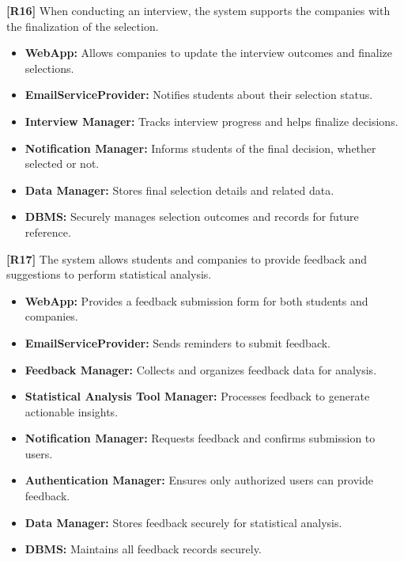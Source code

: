 \textbf{[R16]} When conducting an interview, the system supports the companies with the finalization of the selection.  
\begin{itemize}
    \item \textbf{WebApp:} Allows companies to update the interview outcomes and finalize selections.  
    \item \textbf{EmailServiceProvider:} Notifies students about their selection status.  
    \item \textbf{Interview Manager:} Tracks interview progress and helps finalize decisions.  
    \item \textbf{Notification Manager:} Informs students of the final decision, whether selected or not.  
    \item \textbf{Data Manager:} Stores final selection details and related data.  
    \item \textbf{DBMS:} Securely manages selection outcomes and records for future reference.  
\end{itemize}  

\textbf{[R17]} The system allows students and companies to provide feedback and suggestions to perform statistical analysis.  
\begin{itemize}
    \item \textbf{WebApp:} Provides a feedback submission form for both students and companies.  
    \item \textbf{EmailServiceProvider:} Sends reminders to submit feedback.  
    \item \textbf{Feedback Manager:} Collects and organizes feedback data for analysis.  
    \item \textbf{Statistical Analysis Tool Manager:} Processes feedback to generate actionable insights.  
    \item \textbf{Notification Manager:} Requests feedback and confirms submission to users. 
    \item \textbf{Authentication Manager:} Ensures only authorized users can provide feedback.  
    \item \textbf{Data Manager:} Stores feedback securely for statistical analysis.  
    \item \textbf{DBMS:} Maintains all feedback records securely.  
\end{itemize}  

